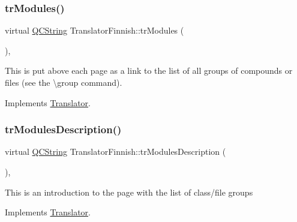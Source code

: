 \mbox{\label{class_translator_finnish_a68056d183e826496bbf75867686fceb9}} 
\subsubsection{\texorpdfstring{trModules()}{trModules()}}
{\footnotesize\ttfamily virtual \mbox{\hyperlink{class_q_c_string}{Q\+C\+String}} Translator\+Finnish\+::tr\+Modules (\begin{DoxyParamCaption}{ }\end{DoxyParamCaption})\hspace{0.3cm}{\ttfamily [inline]}, {\ttfamily [virtual]}}

This is put above each page as a link to the list of all groups of compounds or files (see the \textbackslash{}group command). 

Implements \mbox{\hyperlink{class_translator}{Translator}}.

\mbox{\label{class_translator_finnish_a886cb4ad3be5fc05a12f0ca6843f021e}} 
\subsubsection{\texorpdfstring{trModulesDescription()}{trModulesDescription()}}
{\footnotesize\ttfamily virtual \mbox{\hyperlink{class_q_c_string}{Q\+C\+String}} Translator\+Finnish\+::tr\+Modules\+Description (\begin{DoxyParamCaption}{ }\end{DoxyParamCaption})\hspace{0.3cm}{\ttfamily [inline]}, {\ttfamily [virtual]}}

This is an introduction to the page with the list of class/file groups 

Implements \mbox{\hyperlink{class_translator}{Translator}}.

\mbox{\label{class_translator_finnish_a42136e396650775295b61be476699775}} 
